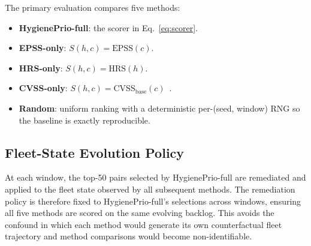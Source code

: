 The primary evaluation compares five methods:
\begin{itemize}
\item \textbf{HygienePrio-full}: the scorer in Eq.~\ref{eq:scorer}.
\item \textbf{EPSS-only}: $S(h,c) = \mathrm{EPSS}(c)$.
\item \textbf{HRS-only}: $S(h,c) = \mathrm{HRS}(h)$.
\item \textbf{CVSS-only}: $S(h,c) = \mathrm{CVSS}_{\mathrm{base}}(c)$~\cite{first2019cvss}.
\item \textbf{Random}: uniform ranking with a deterministic per-(seed, window) RNG so the baseline is exactly reproducible.
\end{itemize}

\subsection{Fleet-State Evolution Policy}

At each window, the top-50 pairs selected by HygienePrio-full are remediated and applied to the fleet state observed by all subsequent methods. The remediation policy is therefore fixed to HygienePrio-full's selections across windows, ensuring all five methods are scored on the same evolving backlog. This avoids the confound in which each method would generate its own counterfactual fleet trajectory and method comparisons would become non-identifiable.
